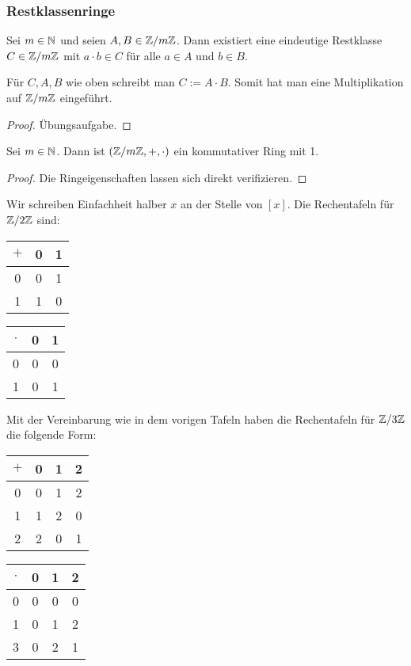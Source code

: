 \subsubsection{Restklassenringe}

\begin{propn}
	Sei $ m \in \mathbb N $ und seien $ A,B \in \mathbb Z/m\mathbb Z $. Dann existiert eine eindeutige Restklasse $ C \in \mathbb Z/m\mathbb Z $ mit $ a \cdot b \in C $ für alle $ a \in A $ und $ b \in B $.
	
	Für $ C, A, B $ wie oben schreibt man $ C := A \cdot B $. Somit hat man eine Multiplikation auf $ \mathbb Z/m\mathbb Z $ eingeführt.
\end{propn}
\begin{proof}
	Übungsaufgabe.
\end{proof}

\begin{propn}
	Sei $ m \in \mathbb N $. Dann ist $ ( \mathbb Z/m\mathbb Z, +, \cdot ) $ ein kommutativer Ring mit 1.
\end{propn}
\begin{proof}
	Die Ringeigenschaften lassen sich direkt verifizieren. 
\end{proof}

\begin{bsp}[$ \Z/2\Z $]
	Wir schreiben Einfachheit halber $x$ an der Stelle von $[x]$. Die Rechentafeln für $\Z / 2 \Z$ sind: 
	\begin{center} 
	\begin{tabular}{c|cc}
		$ + $ & 0 & 1 \\
		\hline
		0 & 0 & 1 \\
		1 & 1 & 0
	\end{tabular}
	\quad\quad\quad 
	\begin{tabular}{c|cc}
		$ \cdot $ & 0 & 1 \\
		\hline
		0 & 0 & 0 \\
		1 & 0 & 1
	\end{tabular}
	\end{center} 
\end{bsp}
\begin{bsp}[$ \Z/3\Z $]
	Mit der Vereinbarung wie in dem vorigen Tafeln haben die Rechentafeln für $\Z / 3 \Z$ die folgende Form: 
	\begin{center} 
	\begin{tabular}{c|ccc}
		$ + $ & 0 & 1 & 2 \\
		\hline
		0 & 0 & 1 & 2 \\
		1 & 1 & 2 & 0 \\
		2 & 2 & 0 & 1
	\end{tabular}
	\quad\quad\quad 
	\begin{tabular}{c|ccc}
		$ \cdot $ & 0 & 1 & 2 \\
		\hline
		0 & 0 & 0 & 0 \\
		1 & 0 & 1 & 2 \\
		3 & 0 & 2 & 1
	\end{tabular}
	\end{center} 
\end{bsp}

